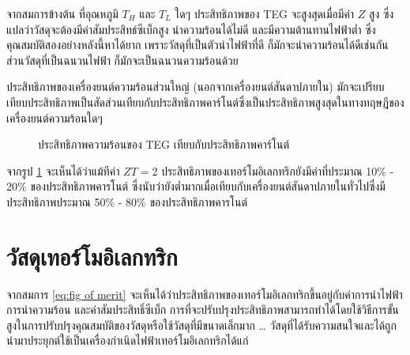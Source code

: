 \documentclass[a4paper,nobib,openany,10pt]{tufte-book}
\begin{document}
จากสมการข้างต้น ที่อุณหภูมิ \(T_H\) และ \(T_L\) ใดๆ ประสิทธิภาพของ TEG
จะสูงสุดเมื่อมีค่า \(Z\) สูง
ซึ่งแปลว่าวัสดุจะต้องมีค่าสัมประสิทธ์ซีเบ็กสูง นำความร้อนได้ไม่ดี
และมีความต้านทานไฟฟ้าต่ำ ซึ่งคุณสมบัติสองอย่างหลังนี้หาได้ยาก
เพราะวัสดุที่เป็นตัวนำไฟฟ้าที่ดี ก็มักจะนำความร้อนได้ดีเช่นกัน
ส่วนวัสดุที่เป็นฉนวนไฟฟ้า ก็มักจะเป็นฉนวนความร้อนด้วย

ประสิทธิภาพของเครื่องยนต์ความร้อนส่วนใหญ่ (นอกจากเครื่องยนต์สันดาปภายใน)
มักจะเปรียบเทียบประสิทธิภาพเป็นสัดส่วนเทียบกับประสิทธิภาพคาร์โนต์ซึ่งเป็นประสิทธิภาพสูงสุดในทางทฤษฎีของเครื่องยนต์ความร้อนใดๆ

\begin{figure}[h]
  \centering
\caption{\label{fig:teg vs carnot efficiency}ประสิทธิภาพความร้อนของ TEG เทียบกับประสิทธิภาพคาร์โนต์}
\end{figure}

จากรูป \ref{fig:teg vs carnot efficiency} จะเห็นได้ว่าแม้ทีค่า \(ZT = 2\) ประสิทธิภาพของเทอร์โมอิเลกทริกยังมีค่าที่ประมาณ 10\% - 20\% ของประสิทธิภาพคารโนต์ ซึ่งนับว่ายังต่ำมากเมื่อเทียบกับเครื่องยนต์สันดาปภายในทั่วไปซึ่งมีประสิทธิภาพประมาณ 50\% - 80\% ของประสิทธิภาพคารโนต์

\section{วัสดุเทอร์โมอิเลกทริก}
\label{sec:org749e7d3}
จากสมการ \ref{eq:fig of merit}
จะเห็นได้ว่าประสิทธิภาพของเทอร์โมอิเลกทริกขึ้นอยู่กับค่าการนำไฟฟ้า
การนำความร้อน และค่าสัมประสิทธิ์ซีเบ็ก
การที่จะปรับปรุงประสิทธิภาพสามารถทำได้โดยใช้วิธีการขั้นสูงในการปรับปรุงคุณสมบัติของวัสดุหรือใช้วัสดุที่มีขนาดเล็กมาก
\ldots{}
วัสดุที่ได้รับความสนใจและได้ถูกนำมาประยุกต์ใช้เป็นเครื่องกำเนิดไฟฟ้าเทอร์โมอิเลกทริกได้แก่
\end{document}
